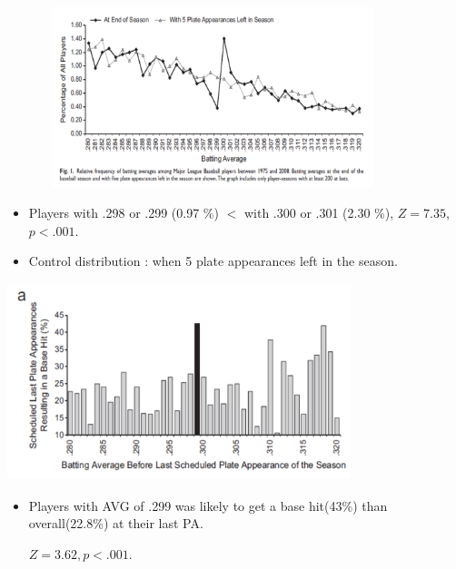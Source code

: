 \documentclass[dvipdfmx,12pt]{beamer}
\begin{document}
\begin{frame}
\begin{center}

\includegraphics[width=12cm,height=5.25cm]{Pope_Simonsohn_F1.pdf}

\end{center}

 \begin{itemize}
 
 \item Players with .298 or .299 (0.97 \%) $<$ with .300 or .301 (2.30 \%), $Z=7.35$, $p<.001$.
 
 \item Control distribution : when 5 plate appearances left in the season.
 

 \end{itemize}

\end{frame}

\begin{frame}

\begin{center}

\includegraphics[width=10cm,height=5.75cm]{Pope_Simonsohn_F2A.pdf}

\end{center}

 \begin{itemize}
 
 \item Players with AVG of .299 was likely to get a base hit(43\%) than overall(22.8\%) at their last PA.
 
 $Z=3.62 , p <.001$.
 
 \end{itemize}

\end{frame}
\end{document}
